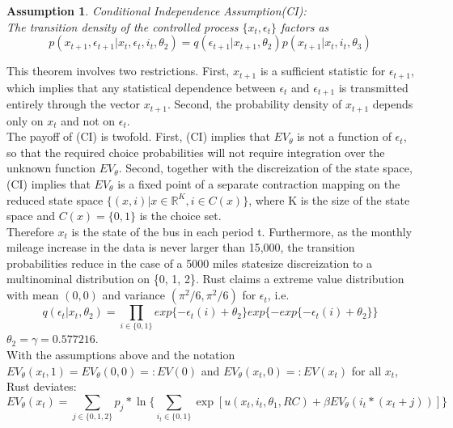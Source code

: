 \documentclass[a4paper,12pt,bold]{scrartcl}
\newtheorem{Assumption}{Assumption}
\begin{document}
\begin{Assumption}
Conditional Independence Assumption(CI):\\
The transition density of the controlled process \(\{x_t, \epsilon_t\}\) factors as
\begin{equation}
  p(x_{t+1}, \epsilon_{t+1} | x_t, \epsilon_t, i_t, \theta_2) = q(\epsilon_{t+1} | x_{t+1}, \theta_2) p(x_{t+1} | x_t, i_t, \theta_3)
\end{equation}
\end{Assumption}
This theorem involves two restrictions. First, \(x_{t+1}\) is a sufficient statistic for \(\epsilon_{t+1}\), which implies that any statistical dependence between \(\epsilon_t\) and \(\epsilon_{t+1}\) is transmitted entirely through the vector \(x_{t+1}\). Second, the probability density of \(x_{t+1}\) depends only on \(x_t\) and not on \(\epsilon_t\).\\ The payoff of (CI) is twofold. First, (CI) implies that \(EV_{\theta}\) is not a function of \(\epsilon_t\), so that the required choice probabilities will not require integration over the unknown function \(EV_{\theta}\). Second, together with the discreization of the state space, (CI) implies that \(EV_{\theta}\) is a fixed point of a separate contraction mapping on the reduced state space \(\{(x, i)| x \in \mathbb{R}^{K} , i \in C(x)\} \), where K is the size of the state space and $C(x)=\{0, 1\}$ is the choice set.\medskip \\
Therefore $x_t$ is the state of the bus in each period t. Furthermore, as the monthly mileage increase in the data is never larger than 15,000, the transition probabilities reduce in the case of a 5000 miles statesize discreization to a multinominal distribution on \{0, 1, 2\}. Rust claims a extreme value distribution  with mean $(0,0)$ and variance $(\pi^2/6, \pi^2/6)$ for $\epsilon_t$, i.e.
\begin{equation}
  q(\epsilon_t|x_t, \theta_2) = \prod_{i \in \{0,1\}} exp\{-\epsilon_t(i) + \theta_2\}exp\{-exp\{-\epsilon_t(i)+\theta_2\}\}
\end{equation}
$\theta_2 = \gamma = 0.577216$.\\
With the assumptions above and the notation \(EV_{ \theta }( x_t, 1) = EV_{ \theta }( 0, 0) =: EV(0)\) and \(EV_{ \theta }( x_t, 0) =: EV(x_t)\) for all \(x_t\), Rust deviates:
\begin{equation}
  EV_{\theta}(x_t) = \sum_{j \in \{0 ,1, 2\}} p_j * \ln\{ \sum_{i_t \in \{0, 1\}} \exp[u(x_t, i_t, \theta_1, RC) + \beta EV_{\theta}(i_t * (x_t + j))]\}
\end{equation}
\end{document}
